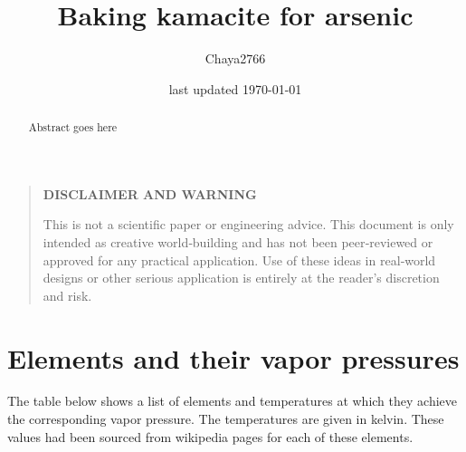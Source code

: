 \documentclass[a4paper]{article}
\title{Baking kamacite for arsenic}
\author{Chaya2766}
\date{last updated \today}
\begin{document}
	\sffamily
	\hyphenchar{}
	\sloppy
	
	\maketitle
	
	\textbf{
		\sloppy
		\hyphenchar{}
		}
	
	\vfill
	
	\begin{abstract}
		Abstract goes here
	\end{abstract}
	
	\vfill
	
	\begin{quote}
		\begin{center}
			\textbf{DISCLAIMER AND WARNING}
		\end{center}
		
		This is not a scientific paper or engineering advice.
		This document is only intended as creative world‑building and has not been peer‑reviewed or approved for any practical application.
		Use of these ideas in real‑world designs or other serious application is entirely at the reader’s discretion and risk.
	\end{quote}
	
	\vfill
	
	\tableofcontents
	
	\pagebreak
	
	\section{Elements and their vapor pressures}
	
	The table below shows a list of elements and temperatures at which they achieve the corresponding vapor pressure.
	The temperatures are given in kelvin.
	These values had been sourced from wikipedia pages for each of these elements.
	
\end{document}
